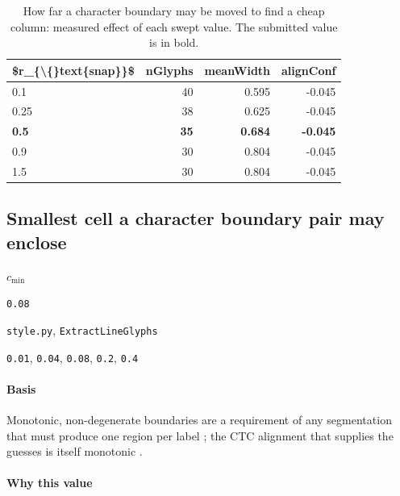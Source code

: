 \begin{table}[htbp]
\centering
\small
\caption{How far a character boundary may be moved to find a cheap column: measured effect of each swept value. The submitted value is in bold.}
\begin{tabular}{lrrr}
\toprule
\$r\_\{\textbackslash\{\}text\{snap\}\}\$ & \textsf{nGlyphs} & \textsf{meanWidth} & \textsf{alignConf} \\
\midrule
0.1 & 40 & 0.595 & -0.045 \\
0.25 & 38 & 0.625 & -0.045 \\
\bfseries 0.5 & \bfseries 35 & \bfseries 0.684 & \bfseries -0.045 \\
0.9 & 30 & 0.804 & -0.045 \\
1.5 & 30 & 0.804 & -0.045 \\
\bottomrule
\end{tabular}
\end{table}

\subsection{Smallest cell a character boundary pair may enclose}

\label{coef:min-cell}

\begin{description}[leftmargin=5.2em,style=sameline]

\item[Symbol] $c_{\min}$

\item[Value] \texttt{0.08}

\item[Source] \texttt{style.py}, \texttt{ExtractLineGlyphs}

\item[Swept] \texttt{0.01}, \texttt{0.04}, \texttt{0.08}, \texttt{0.2}, \texttt{0.4}

\end{description}

\paragraph{Basis}

Monotonic, non-degenerate boundaries are a requirement of any segmentation that must produce one region per label \cite{likforman2007}; the CTC alignment that supplies the guesses is itself monotonic \cite[p.~370]{graves2006}.

\paragraph{Why this value}

